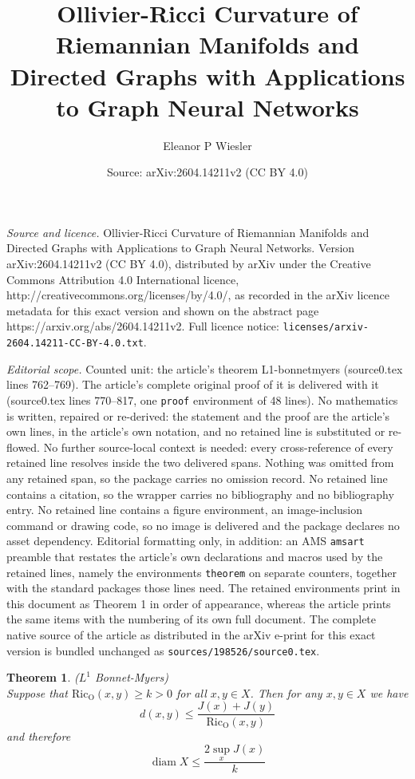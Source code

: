 \documentclass[10pt,a4paper]{amsart}
\title{Ollivier-Ricci Curvature of Riemannian Manifolds and Directed Graphs with Applications to Graph Neural Networks}
\author{Eleanor P Wiesler}
\date{Source: arXiv:2604.14211v2 (CC BY 4.0)}
\newtheorem{theorem}{Theorem}
\begin{document}
\maketitle

\noindent\emph{Source and licence.} Ollivier-Ricci Curvature of Riemannian Manifolds and Directed Graphs with Applications to Graph Neural Networks. Version arXiv:2604.14211v2 (CC BY 4.0), distributed by arXiv under the Creative Commons Attribution 4.0 International licence, http://creativecommons.org/licenses/by/4.0/, as recorded in the arXiv licence metadata for this exact version and shown on the abstract page https://arxiv.org/abs/2604.14211v2. Full licence notice: \texttt{licenses/arxiv-2604.14211-CC-BY-4.0.txt}.\par\smallskip

\noindent\textit{Editorial scope.} Counted unit: the article's theorem L1-bonnetmyers (source0.tex lines 762--769). The article's complete original proof of it is delivered with it (source0.tex lines 770--817, one \texttt{proof} environment of 48 lines). No mathematics is written, repaired or re-derived: the statement and the proof are the article's own lines, in the article's own notation, and no retained line is substituted or re-flowed.  No further source-local context is needed: every cross-reference of every retained line resolves inside the two delivered spans.  Nothing was omitted from any retained span, so the package carries no omission record.  No retained line contains a citation, so the wrapper carries no bibliography and no bibliography entry.  No retained line contains a figure environment, an image-inclusion command or drawing code, so no image is delivered and the package declares no asset dependency.  Editorial formatting only, in addition: an AMS \texttt{amsart} preamble that restates the article's own declarations and macros used by the retained lines, namely the environments \texttt{theorem} on separate counters, together with the standard packages those lines need.  The retained environments print in this document as Theorem 1 in order of appearance, whereas the article prints the same items with the numbering of its own full document.  The complete native source of the article as distributed in the arXiv e-print for this exact version is bundled unchanged as \texttt{sources/198526/source0.tex}.
\begin{theorem} \label{thm: L1-bonnetmyers}($L^1$ Bonnet-Myers) \\ Suppose that $\operatorname{Ric_O}(x, y) \geq k >0$ for all $x, y \in X$. Then for any $x, y \in X$ we have
$$
d(x, y) \leq  \frac{J(x)+J(y)}{\operatorname{Ric_O}(x, y)}
$$
and therefore
$$\operatorname{diam} X \leq \frac{2 \sup _x J(x)}{k}
$$
\end{theorem}
\end{document}
